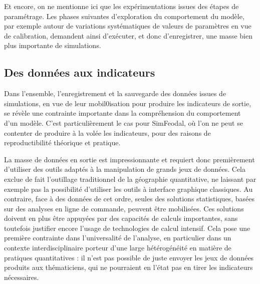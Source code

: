 	Et encore, on ne mentionne ici que les expérimentations issues des étapes de paramétrage.
	Les phases suivantes d'exploration du comportement du modèle, par exemple autour de variations systématiques de valeurs de paramètres en vue de calibration, demandent ainsi d'exécuter, et donc d'enregistrer, une masse bien plus importante de simulations.

	\subsection{Des données aux indicateurs}\label{subsec:donnees-indicateurs}
	Dans l'ensemble, l'enregistrement et la sauvegarde des données issues de simulations, en vue de leur mobil0isation pour produire les indicateurs de sortie, se révèle une contrainte importante dans la compréhension du comportement d'un modèle.
	C'est particulièrement le cas pour SimFeodal, où l'on ne peut se contenter de produire à la volée les indicateurs, pour des raisons de reproductibilité théorique et pratique.
	
	La masse de données en sortie est impressionnante et requiert donc premièrement d'utiliser des outils adaptés à la manipulation de grands jeux de données.
	Cela exclue de fait l'outillage traditionnel de la géographie quantitative, ne laissant par exemple pas la possibilité d'utiliser les outils à interface graphique classiques.
	Au contraire, face à des données de cet ordre, seules des solutions statistiques, basées sur des analyses en ligne de commande, peuvent être mobilisées.
	Ces solutions doivent en plus être appuyées par des capacités de calculs importantes, sans toutefois justifier encore l'usage de technologies de calcul intensif.
	Cela pose une première contrainte dans l'universalité de l'analyse, en particulier dans un contexte interdisciplinaire porteur d'une large hétérogénéité en matière de pratiques quantitatives : il n'est pas possible de juste envoyer les jeux de données produits aux thématiciens, qui ne pourraient en l'état pas en tirer les indicateurs nécessaires.

